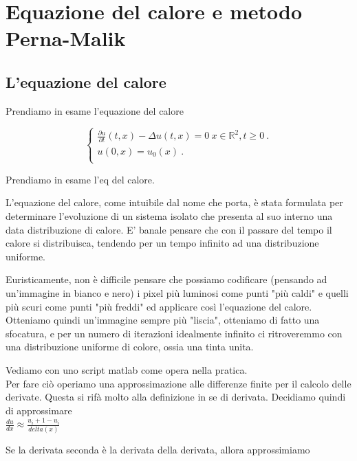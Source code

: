 \chapter{Equazione del calore e metodo Perna-Malik}

\section{L'equazione del calore}

\raggedright

Prendiamo in esame l'equazione del calore

\begin{equation} 
\begin{cases}

\frac{\partial u}{\partial t}(t,x)-\Delta u(t,x) = 0 \ x \in \mathbb R^2, t\ge 0 \ .\\ 

u(0,x) = u_0(x)\ . \\

\end{cases}
\end{equation}

Prendiamo in esame l'eq del calore.

L'equazione del calore, come intuibile dal nome che porta, è stata formulata per determinare l'evoluzione di un sistema isolato che presenta al suo interno una data distribuzione di calore. E' banale pensare che con il passare del tempo il calore si distribuisca, tendendo per un tempo infinito ad una distribuzione uniforme.

\vspace{1em}

Euristicamente, non è difficile pensare che possiamo codificare (pensando ad un'immagine in bianco e nero) i pixel più luminosi come punti "più caldi" e quelli più scuri come punti "più freddi" ed applicare così l'equazione del calore.\\
Otteniamo quindi un'immagine sempre più "liscia", otteniamo di fatto una sfocatura, e per un numero di iterazioni idealmente infinito ci ritroveremmo con una distribuzione uniforme di colore, ossia una tinta unita.

\vspace{1em}

Vediamo con uno script matlab come opera nella pratica. \\
Per fare ciò operiamo una approssimazione alle differenze finite per il calcolo delle derivate. Questa si rifà molto alla definizione in se di derivata. Decidiamo quindi di approssimare \\
\vspace{2pt}
\centering 
$\frac{du}{dx} \approx \frac{u_i+1 - u_i}{delta(x)} $\\
\vspace{2pt}
\raggedright
Se la derivata seconda è la derivata della derivata, allora approssimiamo \\
\vspace{3cm}

